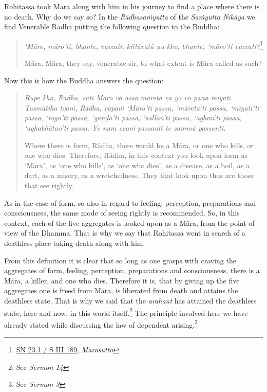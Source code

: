 Rohitassa took Māra along with him in his journey to find a place where there is no death. Why do we say so? In the \emph{Rādhasaṁyutta} of the \emph{Saṁyutta Nikāya} we find Venerable Rādha putting the following question to the Buddha:

\begin{quote}
\emph{`Māro, māro'ti, bhante, vuccati, kittāvatā nu kho, bhante, `māro'ti vuccati?}\footnote{\href{https://suttacentral.net/sn23.1/pli/ms}{SN 23.1 / S III 189}, \emph{Mārosutta}}

Māra, Māra, they say, venerable sir, to what extent is Māra called as such?
\end{quote}

Now this is how the Buddha answers the question:

\begin{quote}
\emph{Rūpe kho, Rādha, sati Māro vā assa māretā vā yo vā pana mīyati. Tasmātiha tvaṁ, Rādha, rūpaṁ `Māro'ti passa, `māretā'ti passa, `mīyatī'ti passa, `rogo'ti passa, `gaṇḍo'ti passa, `sallan'ti passa, `aghan'ti passa, `aghabhūtan'ti passa. Ye nam evaṁ passanti te sammā passanti.}

Where there is form, Rādha, there would be a Māra, or one who kills, or one who dies. Therefore, Rādha, in this context you look upon form as `Māra', as `one who kills', as `one who dies', as a disease, as a boil, as a dart, as a misery, as a wretchedness. They that look upon thus are those that see rightly.
\end{quote}

As in the case of form, so also in regard to feeling, perception, preparations and consciousness, the same mode of seeing rightly is recommended. So, in this context, each of the five aggregates is looked upon as a Māra, from the point of view of the Dhamma. That is why we say that Rohitassa went in search of a deathless place taking death along with him.

From this definition it is clear that so long as one grasps with craving the aggregates of form, feeling, perception, preparations and consciousness, there is a Māra, a killer, and one who dies. Therefore it is, that by giving up the five aggregates one is freed from Māra, is liberated from death and attains the deathless state. That is why we said that the \emph{arahant} has attained the deathless state, here and now, in this world itself.\footnote{See \emph{Sermon 14}} The principle involved here we have already stated while discussing the law of dependent arising.\footnote{See \emph{Sermon 3}}

